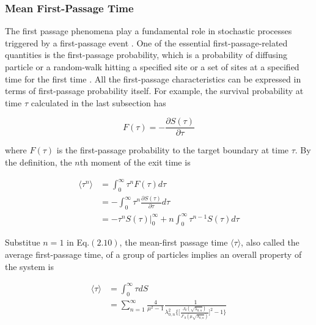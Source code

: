 \subsubsection{Mean First-Passage Time}


The first passage phenomena play a fundamental role in stochastic
processes triggered by a first-passage event
\cite{van1992stochastic}. One of the essential first-passage-related
quantities is the first-passage probability, which is a probability of
diffusing particle or a random-walk hitting a specified site or a set
of sites at a specified time for the first time
\cite{redner2001guide}. All the first-passage characteristics can be
expressed in terms of first-passage probability itself. For example,
the survival probability at time $\tau$ calculated in the last
subsection has

\begin{equation}
  F(\tau) = - \frac{\partial S(\tau)}{\partial \tau}
\end{equation}

where $F(\tau)$ is the first-passage probability to the target
boundary at time $\tau$. By the definition, the $n$th moment of the
exit time \cite{redner2001guide} is

\begin{equation}
  \begin{split}
    \langle \tau^n \rangle &= \int_{0}^{\infty} \tau^n F(\tau) d\tau \\
    &= - \int_{0}^{\infty} \tau^n  \frac{\partial S(\tau)}{\partial \tau} d\tau \\
    &= -\tau^n S(\tau) |_{0}^{\infty} + n\int_{0}^{\infty} \tau^{n-1}S(\tau) d\tau
\end{split}
\end{equation}


Substitue $n=1$ in Eq.$(2.10)$, the mean-first passage time $\langle
\tau \rangle$, also called the average first-passage time, of a group
of particles implies an overall property of the system is

\begin{equation}
  \begin{split}
    \langle \tau \rangle &= \int_{0}^{\infty} \tau dS\\
    &=\sum_{n=1}^{\infty} \frac{4}{\mu^2 - 1}
    \frac{1}{\lambda^2_{0,n}\bigg\{\bigg[\frac{J_0(\sqrt{\lambda_{0,n}})}{J'_0(\mu\sqrt{\lambda_{0,n}})}\bigg]^2
      -1\bigg\}}
  \end{split}
\end{equation}



